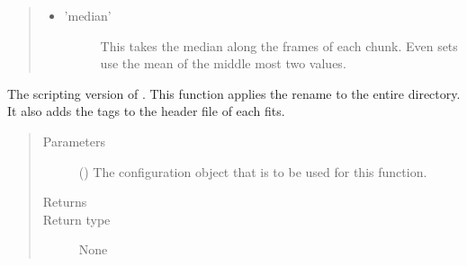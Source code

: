 \documentclass[letterpaper,10pt,english]{sphinxmanual}
\begin{document}
\begin{fulllineitems}
\begin{quote}
\begin{description}
\begin{itemize}
\begin{itemize}
\begin{description}
\end{description}

\item {} \begin{description}
\item[{’median’}] \leavevmode
This takes the median along the frames of
each chunk. Even sets use the mean of the
middle most two values.

\end{description}

\end{itemize}


\end{itemize}

\end{description}\end{quote}

\end{fulllineitems}


\begin{fulllineitems}
\label{\detokenize{docstrings/ifa_smeargle.reformat.collapse:ifa_smeargle.reformat.collapse.script_collapse_by_average_endpoints}}
The scripting version of .
This function applies the rename to the entire directory. It
also adds the tags to the header file of each fits.
\begin{quote}\begin{description}
\item[{Parameters}] \leavevmode
{} () \textendash{} The configuration object that is to be used for this
function.

\item[{Returns}] \leavevmode


\item[{Return type}] \leavevmode
None

\end{description}\end{quote}

\end{fulllineitems}
\end{document}
